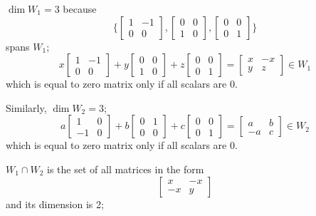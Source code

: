 \documentclass{article}
\begin{document}
\begin{enumerate}[listparindent=\parindent]
\begin{enumerate}[listparindent=\parindent]
    \(\dim W_1 = 3\) because
    \[
        \{
            \begin{bmatrix} 1 & -1 \\ 0 & 0 \end{bmatrix},
            \begin{bmatrix} 0 & 0 \\ 1 & 0 \end{bmatrix},
            \begin{bmatrix} 0 & 0 \\ 0 & 1 \end{bmatrix}
        \}
    \]
    spans \(W_1\);
    \[
        x \begin{bmatrix} 1 & -1 \\ 0 & 0 \end{bmatrix} +
        y \begin{bmatrix} 0 & 0 \\ 1 & 0 \end{bmatrix} +
        z \begin{bmatrix} 0 & 0 \\ 0 & 1 \end{bmatrix}
        =
        \begin{bmatrix}
            x & -x \\
            y & z
        \end{bmatrix}
        \in W_1
    \]
    which is equal to zero matrix only if all scalars are 0.

    Similarly, \(\dim W_2 = 3\);
    \[
        a \begin{bmatrix} 1 & 0 \\ -1 & 0 \end{bmatrix} +
        b \begin{bmatrix} 0 & 1 \\ 0 & 0 \end{bmatrix} +
        c \begin{bmatrix} 0 & 0 \\ 0 & 1 \end{bmatrix}
        =
        \begin{bmatrix}
            a & b \\
            -a & c
        \end{bmatrix}
        \in W_2
    \]
    which is equal to zero matrix only if all scalars are 0.

    \(W_1 \cap W_2\) is the set of all matrices in the form
    \[
        \begin{bmatrix}
            x & -x \\
            -x & y
        \end{bmatrix}
    \] and its dimension is 2;


\end{enumerate}
\end{enumerate}
\end{document}
